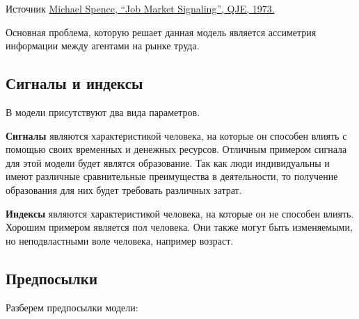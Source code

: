 \begin{mybox}{Источник}
    \href{https://www.sfu.ca/~allen/Spence.pdf}{Michael Spence, “Job Market Signaling”, QJE, 1973.}
\end{mybox}

\indent\setlength{\parindent}{1em}Основная проблема, которую решает данная модель является ассиметрия информации между
агентами на рынке труда.

\subsection{Сигналы и индексы}

\indent\setlength{\parindent}{1em}В модели присутствуют два вида параметров.\smallskip

\indent\setlength{\parindent}{1em}\textbf{Сигналы} являются характеристикой человека, на которые он способен влиять с
помощью своих временных и денежных ресурсов. Отличным примером сигнала для этой модели будет являтся образование. Так
как люди индивидуальны и имеют различные сравнительные преимущества в деятельности, то получение образования для них
будет требовать различных затрат.\smallskip

\indent\setlength{\parindent}{1em}\textbf{Индексы} являются характеристикой человека, на которые он не способен влиять.
Хорошим примером является пол человека. Они также могут быть изменяемыми, но неподвластными воле человека, например
возраст.

\subsection{Предпосылки}

\indent\setlength{\parindent}{1em}Разберем предпосылки модели:

